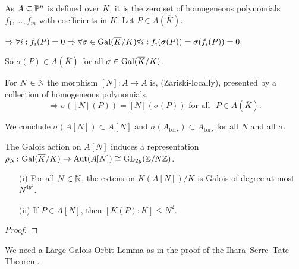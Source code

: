 \documentclass{beamer}
\begin{document}
\begin{frame}
  As $A\subseteq{\mathbb{P}}^n$ is defined over $K$, it is the zero set 
  of  homogeneous polynomials $f_1,\ldots,f_m$ with
  coefficients in $K$. Let $P\in A(\overline K)$. 

  $\Rightarrow \forall i: f_i(P) = 0 
  \Rightarrow \forall \sigma\in\mathrm{Gal}(\overline{K}/K) \forall i: f_i(\sigma(P))=\sigma(f_i(P))=0$

  So $\sigma(P) \in A(\overline K)$ for all $\sigma\in \mathrm{Gal}(\overline{K}/K)$. 

  For $N\in{\mathbb{N}}$ the morphism
  $[N]\colon A\rightarrow A$ is, (Zariski-locally), presented
  by a collection of homogeneous polynomials. 
  $$\Rightarrow \sigma([N](P)) = 
  [N](\sigma(P))\text{ for {all} $P\in A(\overline K)$.}$$
  

  We conclude 
  $\sigma(A[N])\subset A[N]$ and
  $\sigma(A_{\mathrm{tors}}) \subset A_{\mathrm{tors}}$ for all $N$
  and all $\sigma$. 

  \begin{definition}
    The Galois action on $A[N]$ induces a representation
    $\rho_N \colon \mathrm{Gal}(\overline{K}/K)\rightarrow\mathrm{Aut}(A[N]) \cong
    \mathrm{GL}_{2g}({\mathbb{Z}}/N{\mathbb{Z}})$.
  \end{definition}
\end{frame}
\begin{frame}
  
  \begin{lemma}
    \begin{enumerate}
    \item[(i)]
      For all $N\in{\mathbb{N}}$, the extension  $K(A[N])/K$ is Galois
      of degree at most $N^{4g^2}$.
    \item[(ii)] If $P\in A[N]$, then $[K(P):K]\le N^2$.
    \end{enumerate}
  \end{lemma}
  \begin{proof}
    \vspace{3cm}
  \end{proof}

  We need a \alert{Large Galois Orbit Lemma} as in the proof of the
  Ihara--Serre--Tate Theorem. 
\end{frame}
\end{document}
